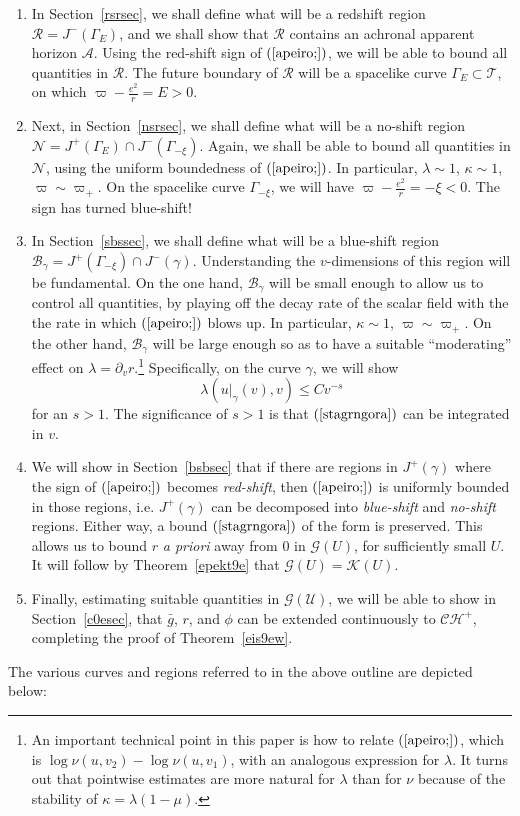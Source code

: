 \documentclass{article}
\begin{document}
{\begin{enumerate}
\item
In Section~\ref{rsrsec}, we shall define what will be a redshift region 
$\mathcal{R}=J^-(\Gamma_E)$, and we shall show 
that $\mathcal{R}$ contains an achronal apparent horizon $\mathcal{A}$. 
Using the red-shift sign of $(\ref{apeiro;})$,
we will be able to bound all quantities in
$\mathcal{R}$. The future boundary of $\mathcal{R}$ will
be a spacelike curve $\Gamma_E\subset\mathcal{T}$,
on which $\varpi-\frac{e^2}r=E>0$.
\item
Next, in Section~\ref{nsrsec}, we shall define what will be
a no-shift region $\mathcal{N}=J^+(\Gamma_E)\cap J^-(\Gamma_{-\xi})$.
Again, we shall be able to bound all quantities in $\mathcal{N}$,
using the uniform boundedness of $(\ref{apeiro;})$.
In particular, $\lambda\sim1$, $\kappa\sim1$, $\varpi\sim\varpi_+$. 
On the spacelike curve $\Gamma_{-\xi}$, we will have
$\varpi-\frac{e^2}r=-\xi<0$. The sign has turned blue-shift!
\item
In Section~\ref{sbssec}, we shall define what will be a blue-shift
region $\mathcal{B}_\gamma=J^+(\Gamma_{-\xi})\cap J^-(\gamma)$.
Understanding the $v$-dimensions of this region will be fundamental.
On the one hand, $\mathcal{B}_\gamma$ will be small enough to allow us
to control all quantities, by playing off the decay rate of the scalar
field with the the rate in which
$(\ref{apeiro;})$ blows up. In particular, $\kappa\sim 1$,
$\varpi\sim\varpi_+$. On the other hand, 
$\mathcal{B}_\gamma$
will be large enough so as to have a suitable
``moderating'' effect on $\lambda=\partial_vr$.\footnote{An important technical
point in this paper is how to relate $(\ref{apeiro;})$, which is 
$\log \nu(u,v_2)-\log \nu(u,v_1)$, with an analogous expression for
$\lambda$. It turns out that pointwise estimates are more natural for
$\lambda$ than for $\nu$ because of the stability of $\kappa=\lambda(1-\mu)$.}
Specifically, 
on the curve $\gamma$, we will show
\begin{equation}
\label{stagrngora}
\lambda(u|_{\gamma}(v),v)\le Cv^{-s}
\end{equation}
for an $s>1$. The significance of $s>1$ is that $(\ref{stagrngora})$ can
be integrated in $v$.
\item
We will show in Section~\ref{bsbsec} that
if there are regions in $J^+(\gamma)$
where the sign of $(\ref{apeiro;})$ becomes \emph{red-shift}, 
then $(\ref{apeiro;})$ is uniformly bounded in those
regions, i.e. $J^+(\gamma)$ can be decomposed into \emph{blue-shift}
and \emph{no-shift} regions. Either
way, a bound $(\ref{stagrngora})$ of the form
is preserved. This allows us to bound $r$ \emph{a priori} away from $0$  in
$\mathcal{G}(U)$, for sufficiently small $U$.
It will follow by Theorem~\ref{epekt9e} that $\mathcal{G}(U)=
\mathcal{K}(U)$. 
\item
Finally, estimating suitable quantities in $\mathcal{G(U)}$, 
we will be able to show in Section~\ref{c0esec}, 
that $\bar{g}$, $r$, and $\phi$ can be extended continuously
to $\mathcal{CH}^+$, completing the proof of Theorem~\ref{eis9ew}.
\end{enumerate}
The various curves and
regions referred to in the above outline
are depicted below:
\[

\]

}
\end{document}
